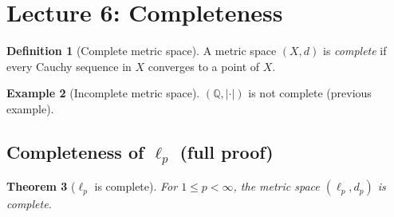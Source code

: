\documentclass[11pt]{article}
\newtheorem{theorem}{Theorem}[section]
\theoremstyle{definition}
\newtheorem{definition}[theorem]{Definition}
\newtheorem{example}[theorem]{Example}
\newcommand{\Q}{\mathbb{Q}}
\begin{document}
\section{Lecture 6: Completeness}

\begin{definition}[Complete metric space]
A metric space $(X,d)$ is \emph{complete} if every Cauchy sequence in $X$ converges to a point of $X$.
\end{definition}

\begin{example}[Incomplete metric space]
$(\Q,|\cdot|)$ is not complete (previous example).
\end{example}

\subsection{Completeness of $\ell_p$ (full proof)}

\begin{theorem}[$\ell_p$ is complete]
For $1\le p<\infty$, the metric space $(\ell_p,d_p)$ is complete.
\end{theorem}
\end{document}

